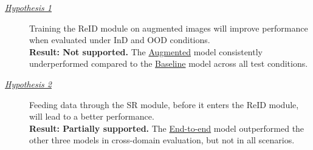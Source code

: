 \begin{description}
  \item[\hyperlink{hypothesis:1}{\textit{Hypothesis 1}}] Training the \acs{ReID} module on augmented images will improve performance when evaluated under \acf{InD} and \acf{OOD} conditions. \\
  \textbf{Result: Not supported.} The \hyperlink{model:augmented}{Augmented} model consistently underperformed compared to the \hyperlink{model:baseline}{Baseline} model across all test conditions.

  \item[\hyperlink{hypothesis:2}{\textit{Hypothesis 2}}] Feeding data through the \acs{SR} module, before it enters the \acs{ReID} module, will lead to a better performance. \\
  \textbf{Result: Partially supported.} The \hyperlink{model:endtoend}{End-to-end} model outperformed the other three models in cross-domain evaluation, but not in all scenarios.
\end{description}



